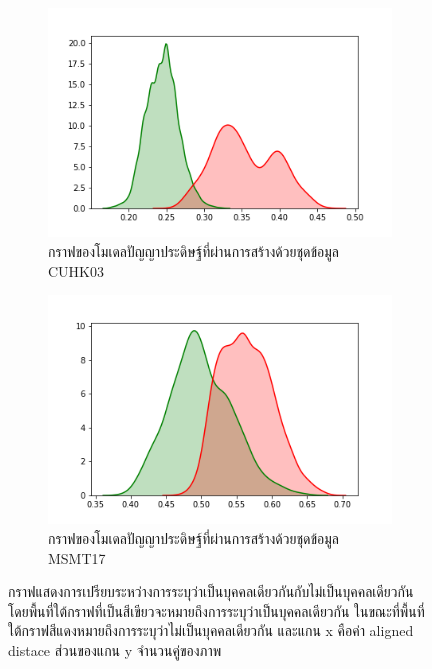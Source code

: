 \begin{figure}[!ht]
\begin{subfigure}[b]{0.4\textwidth}
        \includegraphics[width=\textwidth]{chapter4/images/graph_cuhk.png}
	\caption{กราฟของโมเดลปัญญาประดิษฐ์ที่ผ่านการสร้างด้วยชุดข้อมูล CUHK03}
        \label{fig:graph_cuhk}
    \end{subfigure}
    \hfill
    \begin{subfigure}[b]{0.4\textwidth}
        \centering
        \includegraphics[width=\textwidth]{chapter4/images/graph_msmt.png}
	\caption{กราฟของโมเดลปัญญาประดิษฐ์ที่ผ่านการสร้างด้วยชุดข้อมูล MSMT17}
        \label{fig:graph_msmt}
    \end{subfigure}
    \hfill
    \caption{กราฟแสดงการเปรียบระหว่างการระบุว่าเป็นบุคคลเดียวกันกับไม่เป็นบุคคลเดียวกัน โดยพื้นที่ใต้กราฟที่เป็นสีเขียวจะหมายถึงการระบุว่าเป็นบุคคลเดียวกัน ในขณะที่พื้นที่ใต้กราฟสีแดงหมายถึงการระบุว่าไม่เป็นบุคคลเดียวกัน และแกน x คือค่า aligned distace ส่วนของแกน y จำนวนคู่ของภาพ  }
    \label{fig: กราฟแสดงการเปรียบระหว่างการระบุว่าเป็นบุคคลเดียวกันกับไม่เป็นบุคคลเดียวกัน}
\end{figure}
